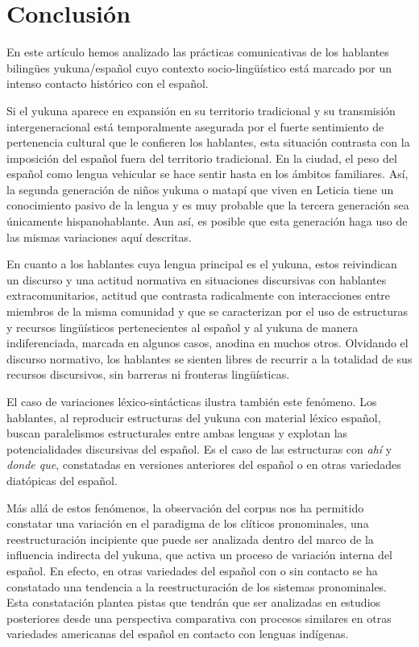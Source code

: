\documentclass[output=paper]{langscibook}
\begin{document}
\section{Conclusión}


En este artículo hemos analizado las prácticas comunicativas de los hablantes bilingües yukuna/español cuyo contexto socio-lingüístico está marcado por un intenso contacto histórico con el español. 

Si el yukuna aparece en expansión en su territorio tradicional y su transmisión intergeneracional está temporalmente asegurada por el fuerte sentimiento de pertenencia cultural que le confieren los hablantes, esta situación contrasta con la imposición del español fuera del territorio tradicional.  En la ciudad, el peso del español como lengua vehicular se hace sentir hasta en los ámbitos familiares. Así, la segunda generación de niños yukuna o matapí que viven en Leticia tiene un conocimiento pasivo de la lengua y es muy probable que la tercera generación sea únicamente hispanohablante. Aun así, es posible que esta generación haga uso de las mismas variaciones aquí descritas.

En cuanto a los hablantes cuya lengua principal es el yukuna, estos reivindican un discurso y una actitud normativa en situaciones discursivas con hablantes extracomunitarios, actitud que contrasta radicalmente con interacciones entre miembros de la misma comunidad y que se caracterizan por el uso de estructuras y recursos lingüísticos pertenecientes al español y al yukuna de manera indiferenciada, marcada en algunos casos, anodina en muchos otros. Olvidando el discurso normativo, los hablantes se sienten libres de recurrir a la totalidad de sus recursos discursivos, sin barreras ni fronteras lingüísticas. 

El caso de variaciones léxico-sintácticas ilustra también este fenómeno.  Los hablantes, al reproducir estructuras del yukuna con material léxico español, buscan paralelismos estructurales entre ambas lenguas y explotan las potencialidades discursivas del español. Es el caso de las estructuras con \textit{ahí} y \textit{donde que}, constatadas en versiones anteriores del español o en otras variedades diatópicas del español. 

Más allá de estos fenómenos, la observación del corpus nos ha permitido constatar una variación en el paradigma de los clíticos pronominales, una reestructuración incipiente que puede ser analizada dentro del marco de la influencia indirecta del yukuna, que activa un proceso de variación interna del español. En efecto, en otras variedades del español con o sin contacto se ha constatado una tendencia a la reestructuración de los sistemas pronominales.  Esta constatación plantea pistas que tendrán que ser analizadas en estudios posteriores desde una perspectiva comparativa con procesos similares en otras variedades americanas del español en contacto con lenguas indígenas.  
\end{document}
